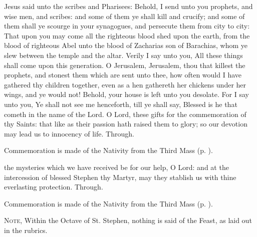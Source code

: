  Jesus said unto the scribes and Pharisees: Behold, I send unto you prophets, and wise men, and scribes: and some of them ye shall kill and crucify; and some of them shall ye scourge in your synagogues, and persecute them from city to city: That upon you may come all the righteous blood shed upon the earth, from the blood of righteous Abel unto the blood of Zacharias son of Barachias, whom ye slew between the temple and the altar. Verily I say unto you, All these things shall come upon this generation. O Jerusalem, Jerusalem, thou that killest the prophets, and stonest them which are sent unto thee, how often would I have gathered thy children together, even as a hen gathereth her chickens under her wings, and ye would not! Behold, your house is left unto you desolate. For I say unto you, Ye shall not see me henceforth, till ye shall say, Blessed is he that cometh in the name of the Lord.
\secret
{} O Lord, these gifts for the commemoration of thy Saints: that like as their passion hath raised them to glory; so our devotion may lead us to innocency of life. Through.
\begin{rubric}
    Commemoration is made of the Nativity from the Third Mass (p. \pageref{NativityMassIII}).
\end{rubric}
\postcommunion
{} the mysteries which we have received be for our help, O Lord: and at the intercession of blessed Stephen thy Martyr, may they stablish us with thine everlasting protection. Through.
\begin{rubric}
    Commemoration is made of the Nativity from the Third Mass (p. \pageref{NativityMassIII}).
\end{rubric}
\begin{rubric}
    \textsc{Note,} Within the Octave of St. Stephen, nothing is said of the Feast, as laid out in the rubrics.
\end{rubric}

